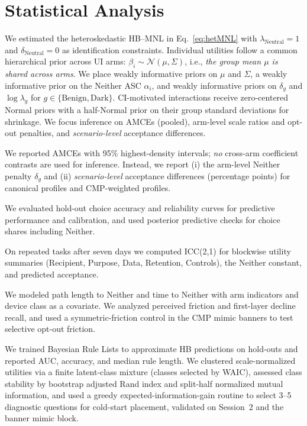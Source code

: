 \documentclass{eusset}
\begin{document}
\section{Statistical Analysis}
\label{subsec:analysis}

We estimated the heteroskedastic HB--MNL in Eq.~\eqref{eq:hetMNL} with $\lambda_{\text{Neutral}}{=}1$ and $\delta_{\text{Neutral}}{=}0$ as identification constraints. Individual utilities follow a common hierarchical prior across UI arms: $\beta_i \sim \mathcal{N}(\mu,\Sigma)$, i.e., \emph{the group mean $\mu$ is shared across arms}. We place weakly informative priors on $\mu$ and $\Sigma$, a weakly informative prior on the Neither ASC $\alpha_i$, and weakly informative priors on $\delta_g$ and $\log\lambda_g$ for $g\in\{\text{Benign},\text{Dark}\}$. CI-motivated interactions receive zero-centered Normal priors with a half-Normal prior on their group standard deviations for shrinkage. We focus inference on AMCEs (pooled), arm-level scale ratios and opt-out penalties, and \emph{scenario-level} acceptance differences.

We reported AMCEs with 95\% highest-density intervals; \emph{no} cross-arm coefficient contrasts are used for inference. Instead, we report (i) the arm-level Neither penalty $\delta_g$ and (ii) \emph{scenario-level} acceptance differences (percentage points) for canonical profiles and CMP-weighted profiles. 

We evaluated hold-out choice accuracy and reliability curves for predictive performance and calibration, and used posterior predictive checks for choice shares including Neither.

On repeated tasks after seven days we computed ICC(2,1) for blockwise utility summaries (Recipient, Purpose, Data, Retention, Controls), the Neither constant, and predicted acceptance. 

We modeled path length to Neither and time to Neither with arm indicators and device class as a covariate. We analyzed perceived friction and first-layer decline recall, and used a symmetric-friction control in the CMP mimic banners to test selective opt-out friction.

We trained Bayesian Rule Lists to approximate HB predictions on hold-outs and reported AUC, accuracy, and median rule length. We clustered scale-normalized utilities via a finite latent-class mixture (classes selected by WAIC), assessed class stability by bootstrap adjusted Rand index and split-half normalized mutual information, and used a greedy expected-information-gain routine to select 3–5 diagnostic questions for cold-start placement, validated on Session~2 and the banner mimic block.
\end{document}
